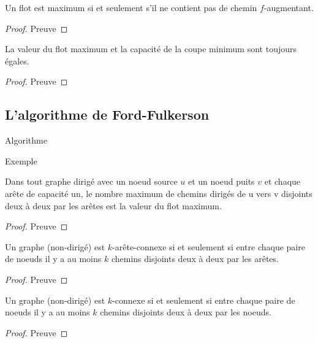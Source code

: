 \begin{mytheo}
  Un flot est maximum si et seulement s’il ne contient pas de chemin $f$-augmentant.
  \begin{proof}
     Preuve \addTODO
  \end{proof}
\end{mytheo}

\begin{mytheo}
  La valeur du flot maximum et la capacité de la coupe minimum sont toujours égales.
  \begin{proof}
     Preuve \addTODO
  \end{proof}
\end{mytheo}

\subsection{L'algorithme de Ford-Fulkerson}
\begin{myalgo}
  Algorithme \addTODO
\end{myalgo}

\begin{myexem}
  Exemple \addTODO
\end{myexem}

\begin{mylem}
  Dans tout graphe dirigé avec un noeud source $u$ et un noeud puits $v$ et chaque arête de capacité un, le nombre maximum de chemins dirigés de u vers v disjoints deux à deux par les arêtes est la valeur du flot maximum.
  \begin{proof}
     Preuve \addTODO
  \end{proof}
\end{mylem}

\begin{mytheo}
  Un graphe (non-dirigé) est $k$-arête-connexe si et seulement si entre chaque paire de noeuds il y a au moins $k$ chemins disjoints deux à deux par les arêtes.
  \begin{proof}
     Preuve \addTODO
  \end{proof}
\end{mytheo}

\begin{mytheo} [Menger]
  Un graphe (non-dirigé) est $k$-connexe si et seulement si entre chaque paire de noeuds il y a au moins $k$ chemins disjoints deux à deux par les noeuds.
  \begin{proof}
     Preuve \addTODO
  \end{proof}
\end{mytheo}